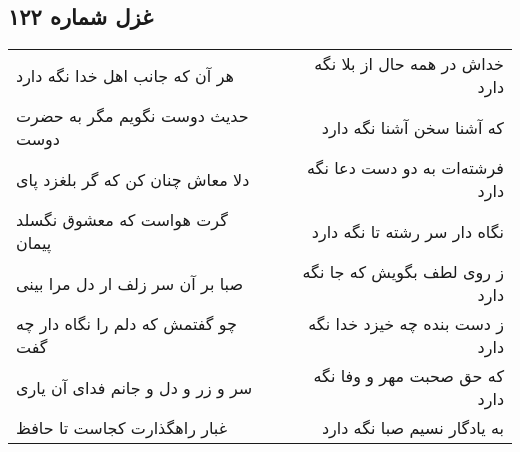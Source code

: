\begin{center}
\section*{غزل شماره ۱۲۲}
\label{sec:sh122}
\begin{longtable}{l p{0.5cm} r}
هر آن که جانب اهل خدا نگه دارد
&&
خداش در همه حال از بلا نگه دارد
\\
حدیث دوست نگویم مگر به حضرت دوست
&&
که آشنا سخن آشنا نگه دارد
\\
دلا معاش چنان کن که گر بلغزد پای
&&
فرشته‌ات به دو دست دعا نگه دارد
\\
گرت هواست که معشوق نگسلد پیمان
&&
نگاه دار سر رشته تا نگه دارد
\\
صبا بر آن سر زلف ار دل مرا بینی
&&
ز روی لطف بگویش که جا نگه دارد
\\
چو گفتمش که دلم را نگاه دار چه گفت
&&
ز دست بنده چه خیزد خدا نگه دارد
\\
سر و زر و دل و جانم فدای آن یاری
&&
که حق صحبت مهر و وفا نگه دارد
\\
غبار راهگذارت کجاست تا حافظ
&&
به یادگار نسیم صبا نگه دارد
\\
\end{longtable}
\end{center}

